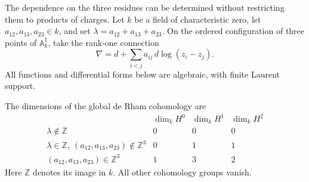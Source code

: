 The dependence on the three residues can be determined without
restricting them to products of charges. Let $k$ be a field of
characteristic zero, let $a_{12},a_{13},a_{23}\in k$, and set
$\lambda=a_{12}+a_{13}+a_{23}$. On the ordered configuration of
three points of $\mathbb A^1_k$, take the rank-one connection
\[
 \nabla=d+\sum_{i<j}a_{ij}\,d\log(z_i-z_j).
\]
All functions and differential forms below are algebraic, with
finite Laurent support.

\begin{proposition}\label{cbc:rc:prop:three-residues}
The dimensions of the global de Rham cohomology are
\[
\begin{array}{c|ccc}
 &\dim_k H^0&\dim_k H^1&\dim_k H^2\\ \hline
 \lambda\notin\mathbb Z&0&0&0\\
 \lambda\in\mathbb Z,\ (a_{12},a_{13},a_{23})\notin\mathbb Z^3
     &0&1&1\\
 (a_{12},a_{13},a_{23})\in\mathbb Z^3&1&3&2
\end{array}
\]
Here $\mathbb Z$ denotes its image in $k$. All other cohomology
groups vanish.
\end{proposition}

